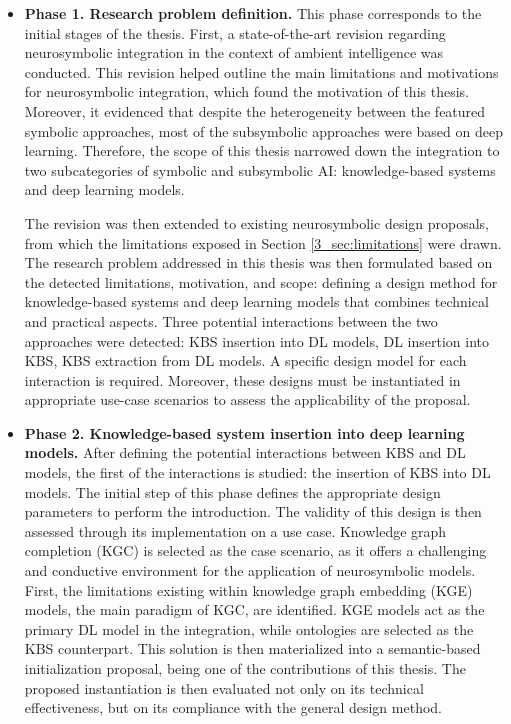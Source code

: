 \begin{itemize}
    \item \textbf{Phase 1. Research problem definition.} This phase corresponds to the initial stages of the thesis. First, a state-of-the-art revision regarding neurosymbolic integration in the context of ambient intelligence was conducted. This revision helped outline the main limitations and motivations for neurosymbolic integration, which found the motivation of this thesis. Moreover, it evidenced that despite the heterogeneity between the featured symbolic approaches, most of the subsymbolic approaches were based on deep learning. Therefore, the scope of this thesis narrowed down the integration to two subcategories of symbolic and subsymbolic AI: knowledge-based systems and deep learning models. 
    
    The revision was then extended to existing neurosymbolic design proposals, from which the limitations exposed in Section \ref{3_sec:limitations} were drawn. The research problem addressed in this thesis was then formulated based on the detected limitations, motivation, and scope: defining a design method for knowledge-based systems and deep learning models that combines technical and practical aspects. Three potential interactions between the two approaches were detected: KBS insertion into DL models, DL insertion into KBS, KBS extraction from DL models. A specific design model for each interaction is required. Moreover, these designs must be instantiated in appropriate use-case scenarios to assess the applicability of the proposal.
    
    \item \textbf{Phase 2. Knowledge-based system insertion into deep learning models.} After defining the potential interactions between KBS and DL models, the first of the interactions is studied: the insertion of KBS into DL models. The initial step of this phase defines the appropriate design parameters to perform the introduction. The validity of this design is then assessed through its implementation on a use case. Knowledge graph completion (KGC) is selected as the case scenario, as it offers a challenging and conductive environment for the application of neurosymbolic models. First, the limitations existing within knowledge graph embedding (KGE) models, the main paradigm of KGC, are identified. KGE models act as the primary DL model in the integration, while ontologies are selected as the KBS counterpart. This solution is then materialized into a semantic-based initialization proposal, being one of the contributions of this thesis. The proposed instantiation is then evaluated not only on its technical effectiveness, but on its compliance with the general design method.
    

\end{itemize}
